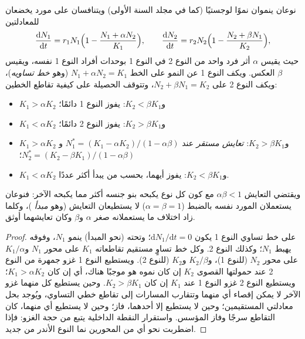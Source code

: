\begin{theorem}\label{thm:b2:speciation:lv}
نوعان ينموان نموًا لوجستيًا (كما في مجلد السنة الأولى) ويتنافسان
على مورد يخضعان للمعادلتين
\[
\frac{\mathrm{d}N_1}{\mathrm{d}t} = r_1 N_1\Bigl(1 - \frac{N_1 + \alpha N_2}{K_1}\Bigr), \qquad
\frac{\mathrm{d}N_2}{\mathrm{d}t} = r_2 N_2\Bigl(1 - \frac{N_2 + \beta N_1}{K_2}\Bigr),
\]
حيث يقيس $\alpha$ أثر فرد واحد من النوع 2
في النوع 1 بوحدات أفراد النوع 1 نفسه، ويقيس $\beta$
العكس. ويكف النوع 1 عن النمو على الخط $N_1 + \alpha N_2 =
K_1$ (وهو \emph{خط تساويه})، ويكف النوع 2 على $N_2 + \beta N_1 = K_2$،
وتتوقف الحصيلة على كيفية تقاطع الخطين:
\begin{itemize}
  \item $K_1 > \alpha K_2$ و$K_2 < \beta K_1$: يفوز النوع 1
        دائمًا؛
  \item $K_1 < \alpha K_2$ و$K_2 > \beta K_1$: يفوز النوع 2
        دائمًا؛
  \item $K_1 > \alpha K_2$ و$K_2 > \beta K_1$: \emph{تعايش
        مستقر} عند $N_1^{*} = (K_1 - \alpha K_2)/(1 - \alpha\beta)$
        و$N_2^{*} = (K_2 - \beta K_1)/(1 - \alpha\beta)$؛
  \item $K_1 < \alpha K_2$ و$K_2 < \beta K_1$: يفوز أيهما،
        بحسب من يبدأ أكثر عددًا.
\end{itemize}
ويقتضي التعايش $\alpha\beta < 1$ مع كون كل نوع يكبحه
بنو جنسه أكثر مما يكبحه الآخر: فنوعان يستعملان
المورد نفسه بالضبط ($\alpha = \beta = 1$) لا يستطيعان التعايش
(وهو \emph{مبدأ })، وكلما زاد
اختلاف ما يستعملانه صغر $\alpha$ و$\beta$ وكان
تعايشهما أوثق.
\end{theorem}
\begin{proof}
على خط تساوي النوع 1 يكون $\mathrm{d}N_1/\mathrm{d}t = 0$؛ وتحته
(نحو المبدأ) ينمو $N_1$، وفوقه يهبط $N_1$؛ وكذلك
النوع 2. وكل خط تساوٍ مستقيم تقاطعاته $K_1$
على محور $N_1$ و$K_1/\alpha$ على محور $N_2$ (للنوع 1)،
و$K_2/\beta$ و$K_2$ (للنوع 2). ويستطيع النوع 1 غزو
جمهرة من النوع 2 عند حمولتها القصوى $K_2$ إن كان نموه
هو موجبًا هناك، أي إن كان $K_1 > \alpha K_2$؛ ويستطيع النوع 2
غزو النوع 1 عند $K_1$ إن كان $K_2 > \beta K_1$. وحين يستطيع كل منهما غزو
الآخر لا يمكن إقصاء أي منهما وتتقارب المسارات إلى
تقاطع خطي التساوي، ويُوجد بحل معادلتي المستقيمين؛
وحين لا يستطيع إلا أحدهما، فاز؛ وحين لا يستطيع أي منهما، كان
التقاطع سرجًا وفاز المؤسس. واستقرار النقطة الداخلية
يتبع من حجة الغزو: فإذا اضطربت نحو أي من
المحورين نما النوع الأندر من جديد.
\end{proof}

